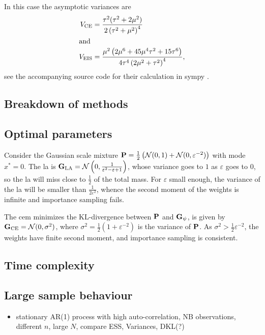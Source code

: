 \begin{example}
    In this case the asymptotic variances are
    \begin{align*}
        V_{\ce} &= \frac{\tau^{2}(\tau^{2} + 2\mu^{2})}{2 \left( \tau^{2} + \mu^{2} \right)^{4}}\\
        \intertext{and}
        V_{\eis} &= \frac{\mu^{2} \left(2 \mu^{6} + 45 \mu^{4} \tau^{2} + 15 \tau^{6}\right)}{4 \tau^{4} \left(2 \mu^{2} + \tau^{2}\right)^{4}},
    \end{align*}
    see the accompanying source code for their calculation in sympy .
\end{example}

\subsection{Breakdown of methods}

\subsection{Optimal parameters}

\begin{example}
  \label{ex:la_failure}
  Consider the Gaussian scale mixture $\P = \frac{1}{2} \left(\mathcal N (0,1) + \mathcal N(0, \varepsilon^{-2})\right)$ with mode $x^{\ast}=0$. 
  The \gls{la} is $\G_{\text{LA}} = \mathcal N \left( 0, \frac{1}{\varepsilon^{2} - \varepsilon + 1} \right)$, whose variance goes to $1$ as $\varepsilon$ goes to $0$, so the \gls{la} will miss close to $\frac 1 2$ of the total mass.
  For $\varepsilon$ small enough, the variance of the \gls{la} will be smaller than $\frac{1}{2\varepsilon^{2}}$, whence the second moment of the weights is infinite and importance sampling fails.

  The \gls{cem} minimizes the KL-divergence between $\P$ and $\G_{\psi}$, is given by $\G_{\text{CE}} = \mathcal N (0, \sigma^{2})$, where $\sigma^{2} = \frac{1}{2}\left( 1 + \varepsilon^{-2} \right)$ is the variance of $\P$.
  As $\sigma^{2} > \frac{1}{2}\varepsilon^{-2}$, the weights have finite second moment, and importance sampling is consistent.
\end{example}

\subsection{Time complexity}

\subsection{Large sample behaviour}

\begin{itemize}
    \item stationary AR(1) process with high auto-correlation, NB observations, different $n$, large $N$, compare ESS, Variances, DKL(?)
\end{itemize}
